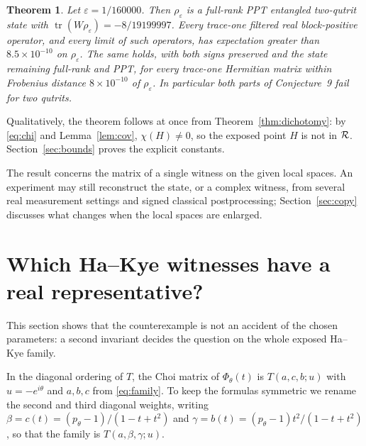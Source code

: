 \documentclass[11pt,a4paper]{article}
\newtheorem{theorem}{Theorem}\newtheorem{lemma}[theorem]{Lemma}\newtheorem{prop}[theorem]{Proposition}\newtheorem{cor}[theorem]{Corollary}
\theoremstyle{definition}\newtheorem{definition}[theorem]{Definition}\newtheorem*{conj}{Conjecture 9 of Shen, Chen and Bian}\newtheorem{remark}[theorem]{Remark}
\newcommand{\tr}{\operatorname{tr}}\newcommand{\im}{\operatorname{Im}}\newcommand{\adj}{\operatorname{adj}}\newcommand{\id}{\mathbb I}
\newcommand{\eps}{\varepsilon}\newcommand{\ket}[1]{\lvert #1\rangle}\newcommand{\bra}[1]{\langle #1\rvert}\newcommand{\F}{\mathrm F}\newcommand{\op}{\mathrm{op}}\newcommand{\C}{\mathbb C}
\begin{document}
\begin{theorem}\label{thm:one}
Let $\eps=1/160000$. Then $\rho_\eps$ is a full-rank PPT entangled two-qutrit state with $\tr(W\rho_\eps)=-8/19199997$. Every trace-one filtered real block-positive operator, and every limit of such operators, has expectation greater than $8.5\times10^{-10}$ on $\rho_\eps$. The same holds, with both signs preserved and the state remaining full-rank and PPT, for every trace-one Hermitian matrix within Frobenius distance $8\times10^{-10}$ of $\rho_\eps$. In particular both parts of Conjecture~9 fail for two qutrits.
\end{theorem}
Qualitatively, the theorem follows at once from Theorem~\ref{thm:dichotomy}: by \eqref{eq:chi} and Lemma~\ref{lem:cov}, $\chi(H)\neq0$, so the exposed point $H$ is not in $\mathcal R$. Section~\ref{sec:bounds} proves the explicit constants.

The result concerns the matrix of a single witness on the given local spaces. An experiment may still reconstruct the state, or a complex witness, from several real measurement settings and signed classical postprocessing; Section~\ref{sec:copy} discusses what changes when the local spaces are enlarged.

\section{Which Ha--Kye witnesses have a real representative?}\label{sec:class}
This section shows that the counterexample is not an accident of the chosen parameters: a second invariant decides the question on the whole exposed Ha--Kye family.

In the diagonal ordering of $T$, the Choi matrix of $\Phi_\theta(t)$ is $T(a,c,b;u)$ with $u=-e^{i\theta}$ and $a,b,c$ from \eqref{eq:family}. To keep the formulas symmetric we rename the second and third diagonal weights, writing $\beta=c(t)=(p_\theta-1)/(1-t+t^2)$ and $\gamma=b(t)=(p_\theta-1)t^2/(1-t+t^2)$, so that the family is $T(a,\beta,\gamma;u)$.
\end{document}
